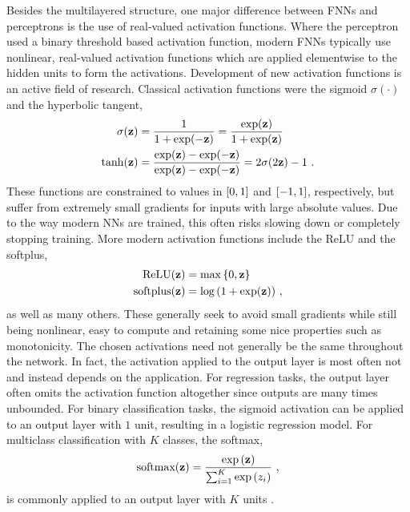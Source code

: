 Besides the multilayered structure, one major difference between \glspl{FNN} and perceptrons is the use of real-valued activation functions. Where the perceptron used a binary threshold based activation function, modern \glspl{FNN} typically use nonlinear, real-valued activation functions which are applied elementwise to the hidden units to form the activations. Development of new activation functions is an active field of research. Classical activation functions were the sigmoid $\sigma(\cdot)$ and the hyperbolic tangent,
\begin{align}
    \sigma({\mathbf{z}}) &= \frac{1}{1+\exp(-{\mathbf{z}})} = \frac{\exp({\mathbf{z}})}{1+\exp({\mathbf{z}})}\\
    \tanh({\mathbf{z}}) &= \frac{\exp({\mathbf{z}})-\exp(-{\mathbf{z}})}{\exp({\mathbf{z}})-\exp(-{\mathbf{z}})} = 2\sigma(2{\mathbf{z}}) - 1 \ .
\end{align}
These functions are constrained to values in ${\left[0, 1\right]}$ and ${\left[-1,1\right]}$, respectively, but suffer from extremely small gradients for inputs with large absolute values. Due to the way modern \glspl{NN} are trained, this often risks slowing down or completely stopping training. More modern activation functions include the \gls{ReLU} \cite{Glorot2011} and the softplus,
\begin{align}
    \text{ReLU}({\mathbf{z}}) &= \max{\left\{0,{\mathbf{z}}\right\}}\\
    \text{softplus}({\mathbf{z}}) &= \log{\left(1+\exp({\mathbf{z}})\right)} \ ,
\end{align}
as well as many others. These generally seek to avoid small gradients while still being nonlinear, easy to compute and retaining some nice properties such as monotonicity.
The chosen activations need not generally be the same throughout the network. In fact, the activation applied to the output layer is most often not and instead depends on the application. For regression tasks, the output layer often omits the activation function altogether since outputs are many times unbounded. For binary classification tasks, the sigmoid activation can be applied to an output layer with $1$ unit, resulting in a logistic regression model. For multiclass classification with $K$ classes, the softmax,
\begin{equation}
    \text{softmax}({\mathbf{z}}) = \frac{\exp{\left({\mathbf{z}}\right)}}{\sum_{i=1}^K \exp{\left(z_i\right)}} \ ,
\end{equation}
is commonly applied to an output layer with $K$ units \cite{Goodfellow2016}.



